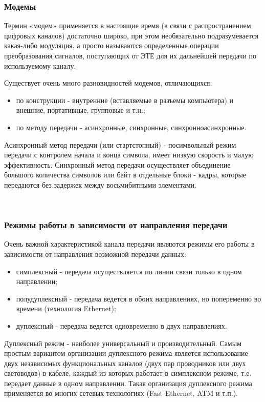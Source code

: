 \documentclass[a4paper]{report}
\begin{document}
\subsubsection{Модемы}
Термин «модем» применяется в настоящие время (в связи с распространением цифровых каналов) достаточно широко, при этом необязательно подразумевается какая-либо модуляция, а просто называются определенные операции преобразования сигналов, поступающих от ЭТЕ для их дальнейшей передачи по используемому каналу.

Существует очень много разновидностей модемов, отличающихся:
\begin{itemize}
\item по конструкции - внутренние (вставляемые в разъемы компьютера) и внешние, портативные, групповые и т.н.;
\item по методу передачи - асинхронные, синхронные, синхронноасинхронные.
\end{itemize}

Асинхронный метод передачи (или стартстопный) - посимвольный режим передачи с контролем начала и конца символа, имеет низкую скорость и малую эффективность. Синхронный метод передачи осуществляет объединение большого количества символов или байт в отдельные блоки - кадры, которые передаются без задержек между восьмибитными элементами.

~

\subsubsection{Режимы работы в зависимости от направления передачи}
Очень важной характеристикой канала передачи являются режимы его работы в зависимости от направления возможной передачи данных:
\begin{itemize}
\item симплексный - передача осуществляется по линии связи только в одном направлении;
\item полудуплексный - передача ведется в обоих направлениях, но попеременно во времени (технология Ethernet);
\item дуплексный - передача ведется одновременно в двух направлениях.
\end{itemize}

Дуплексный режим - наиболее универсальный и производительный. Самым простым вариантом организации дуплексного режима является использование двух независимых функциональных каналов (двух пар проводников или двух световодов) в кабеле, каждый из которых работает в симплексном режиме, т.е. передает данные в одном направлении. Такая организация дуплексного режима применяется во многих сетевых технологиях (Fast Ethernet, ATM и т.п.).
\end{document}

